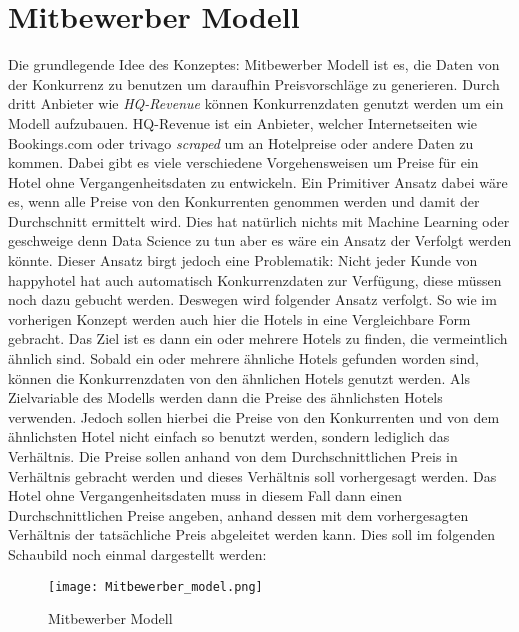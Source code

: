 \section{Mitbewerber Modell}
\label{sec:Mitbewerber}
Die grundlegende Idee des Konzeptes: Mitbewerber Modell ist es, die Daten von der Konkurrenz zu benutzen um daraufhin Preisvorschläge zu generieren. 
\newline
\newline
Durch dritt Anbieter wie \emph{HQ-Revenue} können Konkurrenzdaten genutzt werden um ein Modell aufzubauen. HQ-Revenue ist ein Anbieter, welcher Internetseiten wie Bookings.com oder trivago \emph{scraped} um an Hotelpreise oder andere Daten zu kommen. Dabei gibt es viele verschiedene Vorgehensweisen um Preise für ein Hotel ohne Vergangenheitsdaten zu entwickeln. Ein Primitiver Ansatz dabei wäre es, wenn alle Preise von den Konkurrenten genommen werden und damit der Durchschnitt ermittelt wird. Dies hat natürlich nichts mit Machine Learning oder geschweige denn Data Science zu tun aber es wäre ein Ansatz der Verfolgt werden könnte. 
\newline
\newline
Dieser Ansatz birgt jedoch eine Problematik: Nicht jeder Kunde von happyhotel hat auch automatisch Konkurrenzdaten zur Verfügung, diese müssen noch dazu gebucht werden. Deswegen wird folgender Ansatz verfolgt. 
\newline
\newline
So wie im vorherigen Konzept \emph{} werden auch hier die Hotels in eine Vergleichbare Form gebracht. Das Ziel ist es dann ein oder mehrere Hotels zu finden, die vermeintlich ähnlich sind. Sobald ein oder mehrere ähnliche Hotels gefunden worden sind, können die Konkurrenzdaten von den ähnlichen Hotels genutzt werden. 
\newline
\newline
Als Zielvariable des Modells werden dann die Preise des ähnlichsten Hotels verwenden.  Jedoch sollen hierbei die Preise von den Konkurrenten und von dem ähnlichsten Hotel nicht einfach so benutzt werden, sondern lediglich das Verhältnis. Die Preise sollen anhand von dem Durchschnittlichen Preis in Verhältnis gebracht werden und dieses Verhältnis soll vorhergesagt werden. 
\newline
\newline 
Das Hotel ohne Vergangenheitsdaten muss in diesem Fall dann einen Durchschnittlichen Preise angeben, anhand dessen mit dem vorhergesagten  Verhältnis der tatsächliche Preis abgeleitet werden kann. Dies soll im folgenden Schaubild noch einmal dargestellt werden:
\begin{figure}[h]
    \centering
    \texttt{[image: Mitbewerber\_model.png]}
    \caption[Mitbewerber Modell]{Mitbewerber Modell}
    \label{img:all_hotels}
\end{figure}
